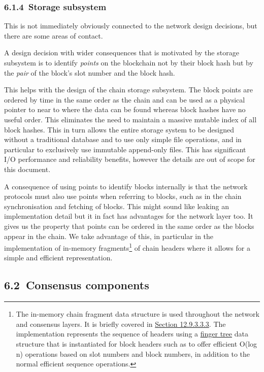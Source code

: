 \documentclass[]{article}
\begin{document}
\hypertarget{storage-subsystem}{%
\subsubsection{​6.1.4​~Storage subsystem}\label{storage-subsystem}}

This is not immediately obviously connected to the network design
decisions, but there are some areas of contact.

A design decision with wider consequences that is motivated by the
storage subsystem is to identify \emph{points} on the blockchain not by
their block hash but by the \emph{pair} of the block's slot number and
the block hash.

This helps with the design of the chain storage subsystem. The block
points are ordered by time in the same order as the chain and can be
used as a physical pointer to near to where the data can be found
whereas block hashes have no useful order. This eliminates the need to
maintain a massive mutable index of all block hashes. This in turn
allows the entire storage system to be designed without a traditional
database and to use only simple file operations, and in particular to
exclusively use immutable append-only files. This has significant I/O
performance and reliability benefits, however the details are out of
scope for this document.

A consequence of using points to identify blocks internally is that the
network protocols must also use points when referring to blocks, such as
in the chain synchronisation and fetching of blocks. This might sound
like leaking an implementation detail but it in fact has advantages for
the network layer too. It gives us the property that points can be
ordered in the same order as the blocks appear in the chain. We take
advantage of this, in particular in the implementation of in-memory
fragments\footnote{The in-memory chain fragment data structure is used
  throughout the network and consensus layers. It is briefly covered in
  \protect\hyperlink{chain-fragments}{{Section 12.9.3.3.3}}. The
  implementation represents the sequence of headers using a
  \href{http://www.staff.city.ac.uk/~ross/papers/FingerTree.html}{{finger
  tree}} data structure that is instantiated for block headers such as
  to offer efficient O(log n) operations based on slot numbers and block
  numbers, in addition to the normal efficient sequence operations.} of
chain headers where it allows for a simple and efficient representation.

\hypertarget{consensus-components}{%
\subsection{​6.2​~Consensus components}\label{consensus-components}}
\end{document}
